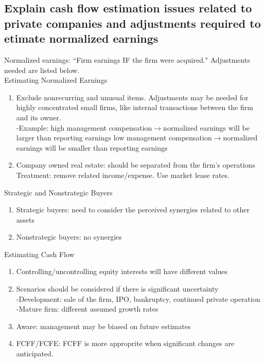 \documentclass{article}
\newcommand{\be}{\begin{enumerate}}
\newcommand{\ee}{\end{enumerate}}
\newcommand{\ra}{$\rightarrow$}
\begin{document}
\subsection{Explain cash flow estimation issues related to private companies
and adjustments required to etimate normalized earnings}
Normalized earnings: ``Firm earnings IF the firm were acquired." Adjustments needed are
listed below.
\\Estimating Normalized Earnings
\be
    \item Exclude nonrecurring and unusual items. Adjustments may be needed for highly concentrated
        small firms, like internal transactions between the firm and its owner.
        \\-Example: high management compensation\ra normalized earnings will be larger than reporting earnings
        low management compensation\ra normalized earnings will be smaller than reporting earnings
    \item Company owned real estate: should be separated from the firm's operations
        \\Treatment: remove related income/expense. Use market lease rates.
\ee
Strategic and Nonstrategic Buyers
\be
    \item Strategic buyers: need to consider the perceived synergies related to other assets
    \item Nonstrategic buyers: no synergies
\ee
Estimating Cash Flow
\be
    \item Controlling/uncontrolling equity interests will have different values
    \item Scenarios should be considered if there is significant uncertainty
        \\-Development: sale of the firm, IPO, bankruptcy, continued private operation
        \\-Mature firm: different assumed growth rates
    \item Aware: management may be biased on future estimates
    \item FCFF/FCFE: FCFF is more approprite when significant changes are anticipated.
\ee
\end{document}
